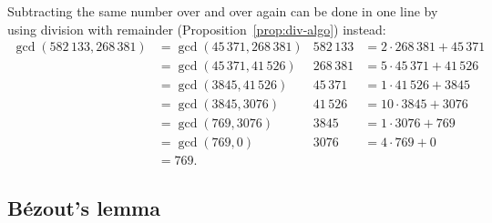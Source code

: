 Subtracting the same number over and over again can be done in one line by using division with remainder (Proposition~\ref{prop:div-algo}) instead:
\begin{align*}
\gcd(582\,133, 268\,381) &= \gcd(45\,371, 268\,381) & 582\,133 &= 2\cdot 268\,381 + 45\,371 \\
&= \gcd(45\,371, 41\,526) & 268\,381 &= 5\cdot 45\,371 + 41\,526 \\
&= \gcd(3845, 41\,526) & 45\,371 &= 1\cdot 41\,526 + 3845 \\
&= \gcd(3845, 3076) & 41\,526 &= 10\cdot 3845 + 3076 \\
&= \gcd(769, 3076) & 3845 &= 1\cdot 3076 + 769 \\
&= \gcd(769, 0) & 3076 &= 4\cdot 769 + 0 \\
&= \boxed{769}.
\end{align*}


\subsection{B\'{e}zout's lemma}